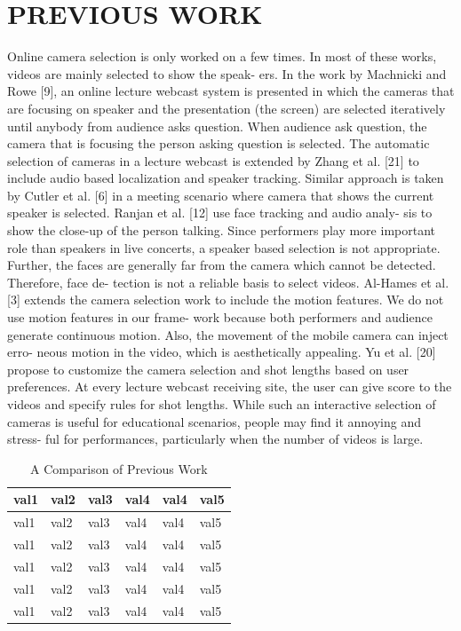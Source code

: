 \documentclass{sig-alternate}
\begin{document}
\section{PREVIOUS WORK}
Online camera selection is only worked on a few times. In
most of these works, videos are mainly selected to show the speak-
ers. In the work by Machnicki and Rowe [9], an online lecture
webcast system is presented in which the cameras that are focusing
on speaker and the presentation (the screen) are selected iteratively
until anybody from audience asks question. When audience ask
question, the camera that is focusing the person asking question is
selected. The automatic selection of cameras in a lecture webcast
is extended by Zhang et al. [21] to include audio based localization
and speaker tracking. Similar approach is taken by Cutler et al. [6]
in a meeting scenario where camera that shows the current speaker
is selected. Ranjan et al. [12] use face tracking and audio analy-
sis to show the close-up of the person talking. Since performers
play more important role than speakers in live concerts, a speaker
based selection is not appropriate. Further, the faces are generally
far from the camera which cannot be detected. Therefore, face de-
tection is not a reliable basis to select videos.
Al-Hames et al. [3] extends the camera selection work to include
the motion features. We do not use motion features in our frame-
work because both performers and audience generate continuous
motion. Also, the movement of the mobile camera can inject erro-
neous motion in the video, which is aesthetically appealing. Yu et
al. [20] propose to customize the camera selection and shot lengths
based on user preferences. At every lecture webcast receiving site,
the user can give score to the videos and specify rules for shot
lengths. While such an interactive selection of cameras is useful
for educational scenarios, people may find it annoying and stress-
ful for performances, particularly when the number of videos is
large.

\begin{table}
\centering
\caption{ A Comparison of Previous Work }
\begin{tabular}{p{3cm}|p{3cm}|p{3cm}|p{3cm}|p{3cm}|l} \hline
val1&val2&val3&val4&val4&val5\\ \hline
val1&val2&val3&val4&val4&val5\\ \hline
val1&val2&val3&val4&val4&val5\\ \hline
val1&val2&val3&val4&val4&val5\\ \hline
val1&val2&val3&val4&val4&val5\\ \hline
val1&val2&val3&val4&val4&val5\\ \hline
\end{tabular}
\end{table}
\end{document}
